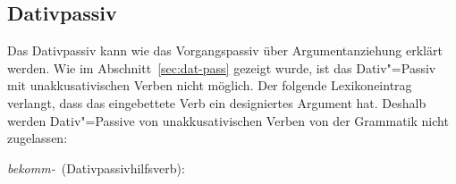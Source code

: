 


\subsection{Dativpassiv}
\label{sec-anal-dativpassiv}

Das
Dativpassiv kann wie das Vorgangspassiv %
über Argumentanziehung
erklärt werden. Wie im Abschnitt~\ref{sec:dat-pass} gezeigt wurde, ist das Dativ"=Passiv
mit unakkusativischen Verben nicht möglich. Der folgende Lexikoneintrag
verlangt, dass das eingebettete Verb ein designiertes Argument hat. Deshalb
werden Dativ"=Passive von unakkusativischen Verben von der Grammatik nicht zugelassen:

\eas
\label{le-bekommen-passive-da}%
\mbox{\emph{bekomm-} (Dativpassivhilfsverb):} \\
\zs

